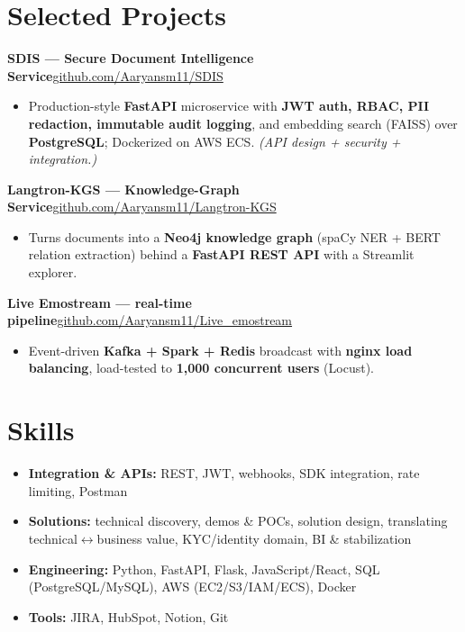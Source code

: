 \documentclass[10pt,a4paper]{article}
\begin{document}
\section*{Selected Projects}
\vspace{1pt}\textbf{SDIS --- Secure Document Intelligence Service}\hfill {\small\href{https://github.com/Aaryansm11/SDIS}{github.com/Aaryansm11/SDIS}}
\begin{itemize}
\item Production-style \textbf{FastAPI} microservice with \textbf{JWT auth, RBAC, PII redaction, immutable audit logging}, and embedding search (FAISS) over \textbf{PostgreSQL}; Dockerized on AWS ECS. \textit{(API design + security + integration.)}
\end{itemize}
\vspace{1pt}\textbf{Langtron-KGS --- Knowledge-Graph Service}\hfill {\small\href{https://github.com/Aaryansm11/Langtron-KGS}{github.com/Aaryansm11/Langtron-KGS}}
\begin{itemize}
\item Turns documents into a \textbf{Neo4j knowledge graph} (spaCy NER + BERT relation extraction) behind a \textbf{FastAPI REST API} with a Streamlit explorer.
\end{itemize}
\vspace{1pt}\textbf{Live Emostream --- real-time pipeline}\hfill {\small\href{https://github.com/Aaryansm11/Live_emostream}{github.com/Aaryansm11/Live\_emostream}}
\begin{itemize}
\item Event-driven \textbf{Kafka + Spark + Redis} broadcast with \textbf{nginx load balancing}, load-tested to \textbf{1,000 concurrent users} (Locust).
\end{itemize}
\section*{Skills}
\begin{itemize}
\item \textbf{Integration \& APIs:} REST, JWT, webhooks, SDK integration, rate limiting, Postman
\item \textbf{Solutions:} technical discovery, demos \& POCs, solution design, translating technical$\leftrightarrow$business value, KYC/identity domain, BI \& stabilization
\item \textbf{Engineering:} Python, FastAPI, Flask, JavaScript/React, SQL (PostgreSQL/MySQL), AWS (EC2/S3/IAM/ECS), Docker
\item \textbf{Tools:} JIRA, HubSpot, Notion, Git
\end{itemize}
\end{document}
